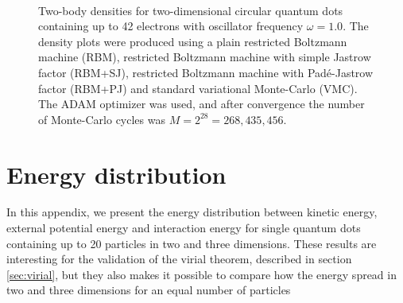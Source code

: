 \begin{landscape}
\begin{figure} [H]
		\\
		
		\caption{Two-body densities for two-dimensional circular quantum dots containing up to 42 electrons with oscillator frequency $\omega=1.0$. The density plots were produced using a plain restricted Boltzmann machine (RBM), restricted Boltzmann machine with simple Jastrow factor (RBM+SJ), restricted Boltzmann machine with Padé-Jastrow factor (RBM+PJ) and standard variational Monte-Carlo (VMC). The  ADAM optimizer was used, and after convergence the number of Monte-Carlo cycles was $M=2^{28}=268,435,456$.}%
		\label{fig:TB_2D_1p0w}
	\end{figure}
\end{landscape}

\section{Energy distribution} \label{sec:energydistribution}
In this appendix, we present the energy distribution between kinetic energy, external potential energy and interaction energy for single quantum dots containing up to 20 particles in two and three dimensions. These results are interesting for the validation of the virial theorem, described in section \ref{sec:virial}, but they also makes it possible to compare how the energy spread in two  and three dimensions for an equal number of particles 

